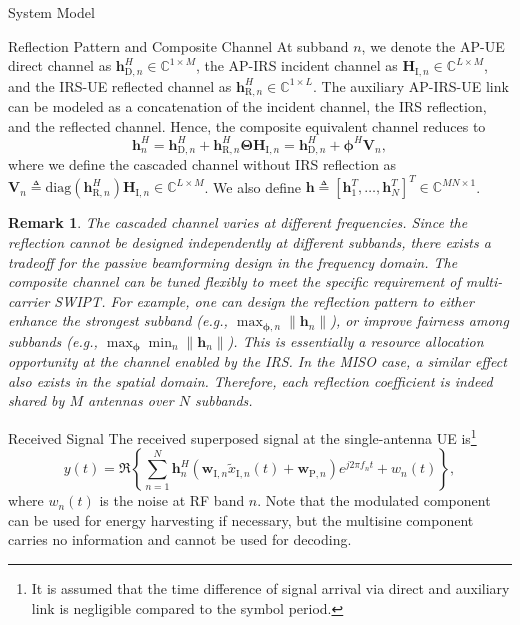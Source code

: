 \documentclass[journal]{IEEEtran}
\newtheorem{remark}{Remark}
\begin{document}
\begin{section}{System Model}
\begin{subsection}{Reflection Pattern and Composite Channel}
			At subband $n$, we denote the AP-UE direct channel as $\boldsymbol{h}_{\mathrm{D},n}^H \in \mathbb{C}^{1 \times M}$, the AP-IRS incident channel as $\boldsymbol{H}_{\mathrm{I},n} \in \mathbb{C}^{L \times M}$, and the IRS-UE reflected channel as $\boldsymbol{h}_{\mathrm{R},n}^H \in \mathbb{C}^{1 \times L}$. The auxiliary AP-IRS-UE link can be modeled as a concatenation of the incident channel, the IRS reflection, and the reflected channel. Hence, the composite equivalent channel reduces to
			\begin{equation}\label{eq:h_n}
				\boldsymbol{h}_{n}^H = \boldsymbol{h}_{\mathrm{D},n}^H + \boldsymbol{h}_{\mathrm{R},n}^H \boldsymbol{\Theta} \boldsymbol{H}_{\mathrm{I},n} = \boldsymbol{h}_{\mathrm{D},n}^H + \boldsymbol{\phi}^H \boldsymbol{V}_{n},
			\end{equation}
			where we define the cascaded channel without IRS reflection as $\boldsymbol{V}_{n} \triangleq \mathrm{diag}(\boldsymbol{h}_{\mathrm{R},n}^H)\boldsymbol{H}_{\mathrm{I},n} \in \mathbb{C}^{L \times M}$. We also define $\boldsymbol{h} \triangleq [\boldsymbol{h}_1^T,\dots,\boldsymbol{h}_N^T]^T \in \mathbb{C}^{MN \times 1}$.

			\begin{remark}\label{re:subband_tradeoff}
				The cascaded channel varies at different frequencies. Since the reflection cannot be designed independently at different subbands, there exists a tradeoff for the passive beamforming design in the frequency domain. The composite channel can be tuned flexibly to meet the specific requirement of multi-carrier SWIPT. For example, one can design the reflection pattern to either enhance the strongest subband (e.g., $\max_{\boldsymbol{\phi},n} \lVert \boldsymbol{h}_n \rVert$), or improve fairness among subbands (e.g., $\max_{\boldsymbol{\phi}} \min_n \lVert \boldsymbol{h}_n \rVert$). This is essentially a resource allocation opportunity at the channel enabled by the IRS. In the MISO case, a similar effect also exists in the spatial domain. Therefore, each reflection coefficient is indeed shared by $M$ antennas over $N$ subbands.
			\end{remark}
		\end{subsection}


		\begin{subsection}{Received Signal}
			The received superposed signal at the single-antenna UE is\footnote{It is assumed that the time difference of signal arrival via direct and auxiliary link is negligible compared to the symbol period.}
			\begin{equation}
				y(t) = \Re\left\{\sum_{n=1}^N{\boldsymbol{h}_{n}^H}{(\boldsymbol{w}_{\mathrm{I},n}\tilde{x}_{\mathrm{I},n}(t)+\boldsymbol{w}_{\mathrm{P},n})}{e^{j2{\pi}{f_n}{t}}}+w_n(t)\right\},
			\end{equation}
			where $w_n(t)$ is the noise at RF band $n$. Note that the modulated component can be used for energy harvesting if necessary, but the multisine component carries no information and cannot be used for decoding.
		\end{subsection}



\end{section}
\end{document}
